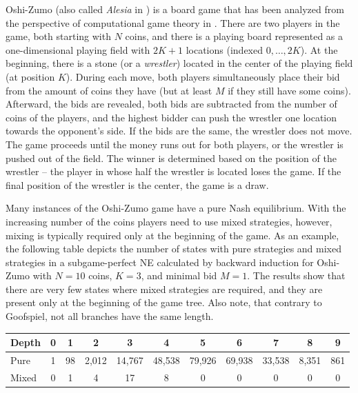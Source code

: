 Oshi-Zumo (also called {\it Alesia} in \cite{Perolat15Approximate}) is a board game that has been analyzed from the perspective of
computational game theory in \cite{buro2003}.
There are two players in the game, both starting with $N$ coins, and there is a playing board represented as a one-dimensional playing field with $2K+1$ locations (indexed $0, \ldots, 2K$).
At the beginning, there is a stone (or a \emph{wrestler}) located in the center of the playing field (\ie at position $K$).
During each move, both players simultaneously place their bid from the amount of coins they have (but at least $M$ if they still have some coins).
Afterward, the bids are revealed, both bids are subtracted from the number of coins of the players, and the highest bidder can push the wrestler one location towards the opponent's side.
If the bids are the same, the wrestler does not move.
The game proceeds until the money runs out for both players, or the wrestler is pushed out of the field.
The winner is determined based on the position of the wrestler -- the player in whose half the wrestler is located loses the game.
If the final position of the wrestler is the center, the game is a draw.

Many instances of the Oshi-Zumo game have a pure Nash equilibrium.
With the increasing number of the coins players need to use mixed strategies, however, mixing is typically required only at the beginning of the game.
As an example, the following table depicts the number of states with pure strategies and mixed strategies in a subgame-perfect NE calculated by backward induction for Oshi-Zumo with $N=10$ coins, $K=3$, and minimal bid $M=1$. The results show that there are very few states where mixed strategies are required, and they are present only at the beginning of the game tree. Also note, that contrary to Goofspiel, not all branches have the same length.

\vspace{0.1cm}

\begin{center}
\small
\begin{tabular}{|l|c|c|c|c|c|c|c|c|c|c|}
\hline Depth & 0 & 1 & 2 & 3 & 4 & 5 & 6 & 7 & 8 & 9\\
\hline Pure  & 1 & 98 & 2,012 & 14,767 & 48,538 & 79,926 & 69,938 & 33,538 & 8,351 & 861\\
\hline Mixed & 0 &  1 &  4 &  17 & 8 & 0 & 0 & 0 & 0 & 0 \\
\hline
\end{tabular}
\end{center}

